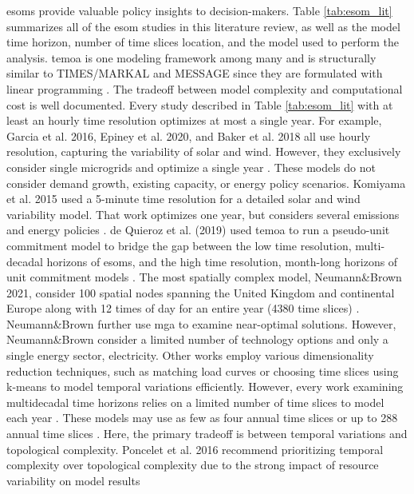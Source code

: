 \glspl{esom} provide valuable policy insights to decision-makers. Table \ref{tab:esom_lit}
summarizes all of the \gls{esom} studies in this literature review, as well as
the model time horizon, number of time slices location, and the model used to
perform the analysis.
\gls{temoa}
is one modeling framework among many and is structurally similar to TIMES/MARKAL
and MESSAGE since they are formulated with linear programming \cite{yue_review_2018}.
The tradeoff between model complexity and computational cost is well documented.
Every study described in Table \ref{tab:esom_lit} with at least an hourly
time resolution optimizes at most a single year. For example, Garcia et al. 2016,
Epiney et al. 2020, and Baker et al. 2018 all use hourly resolution, capturing
the variability of solar and wind. However, they exclusively consider single microgrids
and optimize a single year
\cite{epiney_economic_2020,baker_optimal_2018,garcia_dynamic_2016}.
These models do not consider demand growth, existing capacity, or energy policy
scenarios. Komiyama et al. 2015 used a 5-minute time resolution for a detailed
solar and wind variability model. That work optimizes one year, but
considers several emissions and energy policies \cite{komiyama_energy_2015}.
de Quieroz et al. (2019) used \gls{temoa} to run a
pseudo-unit commitment model to bridge the gap between the low time resolution,
multi-decadal horizons of \glspl{esom}, and the high time resolution, month-long
horizons of unit commitment models \cite{de_queiroz_repurposing_2019}.
The most spatially complex model, Neumann\&Brown 2021, consider 100 spatial nodes
spanning the United Kingdom and continental Europe along with 12 times of day for
an entire year (4380 time slices) \cite{neumann_near-optimal_2021}. Neumann\&Brown
further use \gls{mga} to examine near-optimal solutions. However, Neumann\&Brown consider
a limited number of technology options and only a single energy sector, electricity.
Other works employ various dimensionality reduction techniques, such as matching
load curves \cite{de_sisternes_value_2016,poncelet_impact_2016} or choosing time
slices using k-means \cite{kotzur_impact_2018} to model temporal variations efficiently.
However, every work examining multidecadal time horizons relies on a limited number
of time slices to model each year
\cite{alzbutas_uncertainty_2012,barron_differential_2015,bennett_extending_2021,
bouckaert_expanding_2014,decarolis_modelling_2016,li_open_2020,poncelet_impact_2016,
seck_embedding_2020,yue_least_2020}. These models may use as few as four annual
time slices \cite{decarolis_modelling_2016} or up to 288 annual time slices \cite{poncelet_impact_2016}.
Here, the primary tradeoff is between temporal variations and topological complexity.
Poncelet et al. 2016 recommend prioritizing temporal complexity over topological
complexity due to the strong impact of resource variability on model results \cite{poncelet_impact_2016}

